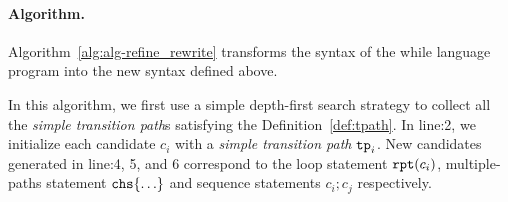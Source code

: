 \paragraph{Algorithm.}
Algorithm~\ref{alg:alg-refine_rewrite} transforms the syntax of the while language program 
into the new syntax defined above.

In this algorithm, we first use a simple depth-first search strategy to collect all the \emph{simple transition path}s satisfying the Definition~\ref{def:tpath}. 
In line:2, we initialize each candidate $c_i$ with a \emph{simple transition path} $\mathtt{tp}_i$. 
New candidates generated in line:4, 5, and 6 correspond to the loop statement $\mathtt{rpt}(c_i)$, multiple-paths statement $\rpchoose{\ldots}$ and sequence statements $c_i; c_j$ respectively.

